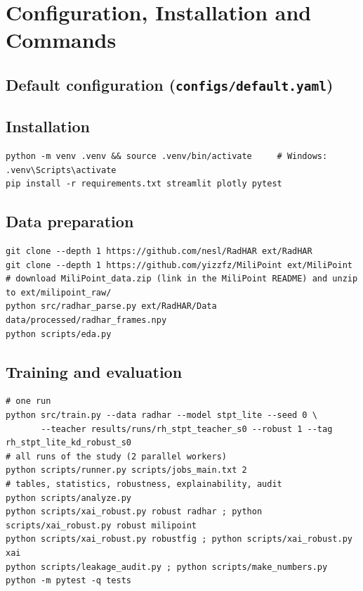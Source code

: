 \chapter{Configuration, Installation and Commands}

\section{Default configuration (\texttt{configs/default.yaml})}


\section{Installation}
\begin{lstlisting}[numbers=none]
python -m venv .venv && source .venv/bin/activate     # Windows: .venv\Scripts\activate
pip install -r requirements.txt streamlit plotly pytest
\end{lstlisting}

\section{Data preparation}
\begin{lstlisting}[numbers=none]
git clone --depth 1 https://github.com/nesl/RadHAR ext/RadHAR
git clone --depth 1 https://github.com/yizzfz/MiliPoint ext/MiliPoint
# download MiliPoint_data.zip (link in the MiliPoint README) and unzip to ext/milipoint_raw/
python src/radhar_parse.py ext/RadHAR/Data data/processed/radhar_frames.npy
python scripts/eda.py
\end{lstlisting}

\section{Training and evaluation}
\begin{lstlisting}[numbers=none]
# one run
python src/train.py --data radhar --model stpt_lite --seed 0 \
       --teacher results/runs/rh_stpt_teacher_s0 --robust 1 --tag rh_stpt_lite_kd_robust_s0
# all runs of the study (2 parallel workers)
python scripts/runner.py scripts/jobs_main.txt 2
# tables, statistics, robustness, explainability, audit
python scripts/analyze.py
python scripts/xai_robust.py robust radhar ; python scripts/xai_robust.py robust milipoint
python scripts/xai_robust.py robustfig ; python scripts/xai_robust.py xai
python scripts/leakage_audit.py ; python scripts/make_numbers.py
python -m pytest -q tests
\end{lstlisting}

